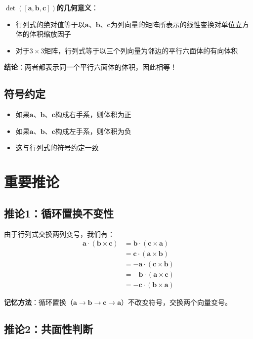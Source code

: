 \documentclass[12pt,a4paper]{article}
\begin{document}
\textbf{$\det([\bm{a}, \bm{b}, \bm{c}])$的几何意义}：
\begin{itemize}
\item 行列式的绝对值等于以$\bm{a}$、$\bm{b}$、$\bm{c}$为列向量的矩阵所表示的线性变换对单位立方体的体积缩放因子
\item 对于$3 \times 3$矩阵，行列式等于以三个列向量为邻边的平行六面体的有向体积
\end{itemize}

\textbf{结论}：两者都表示同一个平行六面体的体积，因此相等！

\subsection{符号约定}

\begin{itemize}
\item 如果$\bm{a}$、$\bm{b}$、$\bm{c}$构成右手系，则体积为正
\item 如果$\bm{a}$、$\bm{b}$、$\bm{c}$构成左手系，则体积为负
\item 这与行列式的符号约定一致
\end{itemize}

\section{重要推论}

\subsection{推论1：循环置换不变性}

由于行列式交换两列变号，我们有：
\begin{align}
\bm{a} \cdot (\bm{b} \times \bm{c}) &= \bm{b} \cdot (\bm{c} \times \bm{a}) \\
&= \bm{c} \cdot (\bm{a} \times \bm{b}) \\
&= -\bm{a} \cdot (\bm{c} \times \bm{b}) \\
&= -\bm{b} \cdot (\bm{a} \times \bm{c}) \\
&= -\bm{c} \cdot (\bm{b} \times \bm{a})
\end{align}

\textbf{记忆方法}：循环置换（$\bm{a} \to \bm{b} \to \bm{c} \to \bm{a}$）不改变符号，交换两个向量变号。

\subsection{推论2：共面性判断}
\end{document}
